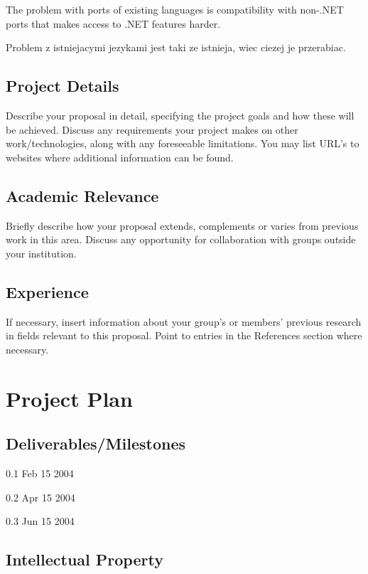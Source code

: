 \documentclass[a4paper,11pt]{article}
\begin{document}
The problem with ports of existing languages is compatibility with
non-.NET ports that makes access to .NET features harder.

Problem z istniejacymi jezykami jest taki ze istnieja, wiec ciezej je przerabiac.

\subsection{Project Details}

Describe your proposal in detail, specifying the project goals and how
these will be achieved. Discuss any requirements your project makes on
other work/technologies, along with any foreseeable limitations. You
may list URL's to websites where additional information can be found.


\subsection{Academic Relevance}

Briefly describe how your proposal extends, complements or varies from
previous work in this area. Discuss any opportunity for collaboration
with groups outside your institution.


\subsection{Experience}

If necessary, insert information about your group's or members' previous
research in fields relevant to this proposal. Point to entries in the
References section where necessary.

\section{Project Plan}

\subsection{Deliverables/Milestones}

0.1 Feb 15 2004

0.2 Apr 15 2004

0.3 Jun 15 2004

\subsection{Intellectual Property}
\end{document}
